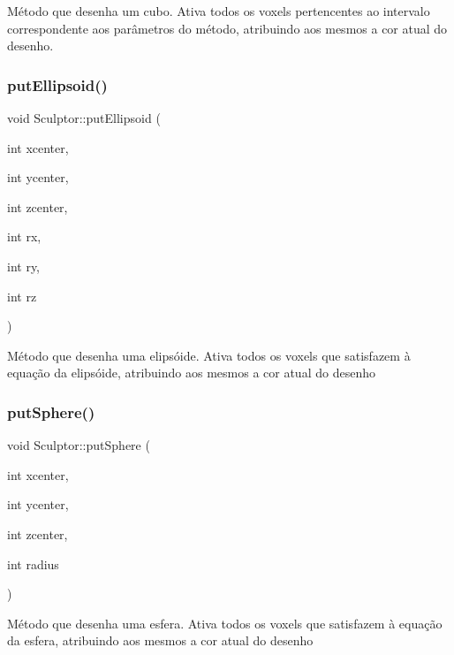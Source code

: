 Método que desenha um cubo. Ativa todos os voxels pertencentes ao intervalo correspondente aos parâmetros do método, atribuindo aos mesmos a cor atual do desenho. \mbox{\label{classSculptor_a093615b0c2b9b3a17a56300b9b939f39}} 
\subsubsection{\texorpdfstring{putEllipsoid()}{putEllipsoid()}}
{\footnotesize\ttfamily void Sculptor\+::put\+Ellipsoid (\begin{DoxyParamCaption}\item[{int}]{xcenter,  }\item[{int}]{ycenter,  }\item[{int}]{zcenter,  }\item[{int}]{rx,  }\item[{int}]{ry,  }\item[{int}]{rz }\end{DoxyParamCaption})}

Método que desenha uma elipsóide. Ativa todos os voxels que satisfazem à equação da elipsóide, atribuindo aos mesmos a cor atual do desenho \mbox{\label{classSculptor_a794a2b6ee8fc8098fd6150cb46101fc6}} 
\subsubsection{\texorpdfstring{putSphere()}{putSphere()}}
{\footnotesize\ttfamily void Sculptor\+::put\+Sphere (\begin{DoxyParamCaption}\item[{int}]{xcenter,  }\item[{int}]{ycenter,  }\item[{int}]{zcenter,  }\item[{int}]{radius }\end{DoxyParamCaption})}

Método que desenha uma esfera. Ativa todos os voxels que satisfazem à equação da esfera, atribuindo aos mesmos a cor atual do desenho \mbox{\label{classSculptor_a4faae5ab2d72f2f682005f468e7e8a92}} 
